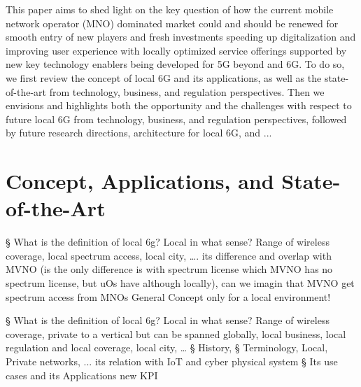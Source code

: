 \documentclass[journal,twocolumn]{IEEEtran}
\begin{document}
 This paper aims to shed light on the key question of how the current mobile network operator (MNO) dominated market could and should be renewed for smooth entry of new players and fresh investments speeding up digitalization and improving user experience with locally optimized service offerings supported by new key technology enablers being developed for 5G beyond and 6G. To do so, we first review the concept of local 6G and its applications, as well as the state-of-the-art from technology, business, and regulation perspectives. Then we envisions and highlights both the opportunity and the challenges with respect to future local 6G from technology, business, and regulation perspectives, followed by future research directions, architecture for local 6G, and ...

 




	





   \section{Concept, Applications, and State-of-the-Art}
   § What is the definition of local 6g?
Local in what sense? Range of wireless coverage, local spectrum access, local city, ….
its difference and overlap with MVNO (is the only difference is with spectrum license which MVNO has no spectrum license, but uOs have although locally), can we imagin that MVNO get  spectrum access from MNOs
General Concept  only for a local environment! 

			§ What is the definition of local 6g?
Local in what sense? Range of wireless coverage, private to a vertical but can be spanned globally, local business, local regulation and local coverage, local city, …
			§ History, 
			§ Terminology, Local, Private networks, ...
   its relation with IoT and cyber physical system 
		§ Its use cases and its Applications
  new KPI
\end{document}
